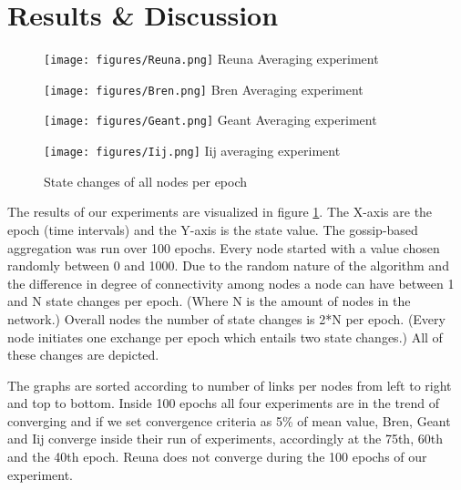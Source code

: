 \section{Results \& Discussion}
\begin{figure}[h!]
	\centering
    \begin{minipage}[t]{0.47\textwidth}
    \vspace{0pt}
    \texttt{[image: figures/Reuna.png]}
    Reuna Averaging experiment
    \end{minipage}
    \begin{minipage}[t]{0.47\textwidth}
    \vspace{0pt}
    \texttt{[image: figures/Bren.png]}
    Bren Averaging experiment
    \end{minipage}
    \vspace{5ex}
    \begin{minipage}[t]{0.47\textwidth}
    \vspace{0pt}
    \texttt{[image: figures/Geant.png]}
    Geant Averaging experiment
    \end{minipage}
    \begin{minipage}[t]{0.47\textwidth}
    \vspace{0pt}
    \texttt{[image: figures/Iij.png]}
    Iij averaging experiment
    \end{minipage}
    \caption{State changes of all nodes per epoch}
    \label{fig:result}

\end{figure}
The results of our experiments are visualized in figure \ref{fig:result}. The X-axis are the epoch (time intervals) and the Y-axis is the state value. The gossip-based aggregation was run over 100 epochs. Every node started with a value chosen randomly between 0 and 1000. Due to the random nature of the algorithm and the difference in degree of connectivity among nodes a node can have between 1 and N state changes per epoch. (Where N is the amount of nodes in the network.) Overall nodes the number of state changes is 2*N per epoch. (Every node initiates one exchange per epoch which entails two state changes.) All of these changes are depicted.

The graphs are sorted according to number of links per nodes from left to right and top to bottom. Inside 100 epochs all four experiments are in the trend of converging and if we set convergence criteria as 5\% of mean value, Bren, Geant and Iij converge inside their run of experiments, accordingly at the 75th, 60th and the 40th epoch. Reuna does not converge during the 100 epochs of our experiment.

